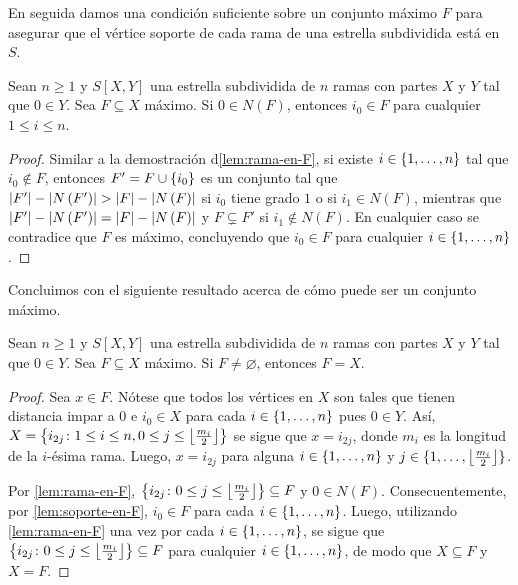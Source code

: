 En seguida damos una condici\'on suficiente sobre un conjunto m\'aximo $F$ para
asegurar que el v\'ertice soporte de cada rama de una estrella subdividida
est\'a en $S$.

\begin{lema}
\label{lem:soporte-en-F}
    Sean $n\geq 1$ y $S[X,Y]$ una estrella subdividida de $n$ ramas con partes $X$ y
    $Y$ tal que $0\in Y$. Sea $F\subseteq X$ m\'aximo. Si $0\in N(F)$, entonces
    $i_0\in F$ para cualquier $1\leq i\leq n$.
\end{lema}

\begin{proof}
    Similar a la demostraci\'on d\cref{lem:rama-en-F}, si existe
    $i\in\{1,\dots, n\}$ tal que $i_0\notin F$, entonces $F'=F\cup\left\{ i_0\right\}$ es un
    conjunto tal que $\abs{F'}-\abs{N\paren{F'}}>\abs{F}-\abs{N\paren{F}}$ si
    $i_0$ tiene grado $1$ o si $i_1\in N(F)$, mientras que
    $\left|F'\right|-\left|N\left( F'\right)\right|=\left|F\right|-\left|N\left( F\right)\right|$ y $F\subsetneq F'$ si
    $i_1\notin N(F)$. En cualquier caso se contradice que $F$ es m\'aximo,
    concluyendo que $i_0\in F$ para cualquier $i\in \{1,\dots, n\}$.

\end{proof}

Concluimos con el siguiente resultado acerca de c\'omo puede ser un conjunto
m\'aximo.

\begin{lema}
\label{lem:maximo}
    Sean $n\geq 1$ y $S[X,Y]$ una estrella subdividida de $n$ ramas con partes $X$ y
    $Y$ tal que $0\in Y$. Sea $F\subseteq X$ m\'aximo. Si $F\neq \varnothing$,
    entonces $F=X$.
\end{lema}

\begin{proof}
    Sea $x\in F$. N\'otese que todos los v\'ertices en $X$ son tales que tienen
    distancia impar a $0$ e $i_0\in X$ para cada $i\in\{1,\dots, n\}$ pues $0\in Y$.
    As\'i, $X=\left\{ i_{2j}\colon 1\leq i \leq n, 0\leq j\leq \left\lfloor
    \frac{m_i}{2}\right\rfloor\right\}$ se sigue que $x=i_{2j}$, donde $m_i$ es la
    longitud de la $i$-\'esima rama. Luego, $x=i_{2j}$ para alguna
    $i\in\{1,\dots, n\}$ y $j\in\{1,\dots, \left\lfloor \frac{m_i}{2}\right\rfloor\}$.
    
    Por \cref{lem:rama-en-F}, $\left\{ i_{2j} \colon 0\leq j \leq
    \left\lfloor\frac{m_i}{2}\right\rfloor\right\} \subseteq F$ y $0\in N(F)$.
    Consecuentemente, por \cref{lem:soporte-en-F}, $i_0\in F$ para cada
    $i\in\{1,\dots, n\}$. Luego, utilizando \cref{lem:rama-en-F} una vez por cada
    $i\in \{1,\dots, n\}$, se sigue que $\left\{ i_{2j} \colon 0\leq j \leq
    \left\lfloor\frac{m_i}{2}\right\rfloor\right\} \subseteq F$ para cualquier $i\in
    \{1,\dots, n\}$, de modo que $X\subseteq F$ y $X=F$.

\end{proof}

